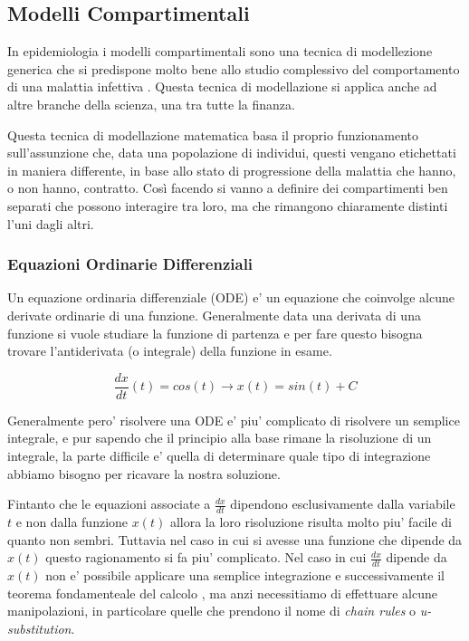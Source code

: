 \subsection{Modelli Compartimentali}
In epidemiologia i modelli compartimentali sono una tecnica di modellezione 
generica che si predispone molto bene allo studio complessivo del comportamento
di una malattia infettiva \cite{wiki:Compartmental_models_in_epidemiology}. 
Questa tecnica di modellazione si applica anche ad altre branche della 
scienza, una tra tutte la finanza.

Questa tecnica di modellazione matematica basa il proprio funzionamento 
sull'assunzione che, data una popolazione di individui, questi vengano 
etichettati in maniera differente, in base allo stato di progressione 
della malattia che hanno, o non hanno, contratto. Così facendo si vanno a 
definire dei compartimenti ben separati che possono interagire tra loro, ma 
che rimangono chiaramente distinti l'uni dagli altri.

\subsubsection*{Equazioni Ordinarie Differenziali}
Un equazione ordinaria differenziale (ODE) e' un equazione che coinvolge alcune derivate
ordinarie di una funzione. \cite{wiki:Equazione_differenziale_ordinaria} Generalmente data una 
derivata di una funzione si vuole studiare la funzione di partenza e per fare questo bisogna trovare 
l'antiderivata (o integrale) della funzione in esame. 

$$\frac{dx}{dt}(t) = cos(t) \rightarrow x(t) = sin(t) + C$$

Generalmente pero' risolvere una ODE e' piu' complicato di risolvere un semplice integrale, e pur sapendo 
che il principio alla base rimane la risoluzione di un integrale, la parte difficile e' quella di determinare
quale tipo di integrazione abbiamo bisogno per ricavare la nostra soluzione.

Fintanto che le equazioni associate a $\frac{dx}{dt}$ dipendono esclusivamente dalla variabile $t$ e non 
dalla funzione $x(t)$ allora la loro risoluzione risulta molto piu' facile di quanto non sembri. Tuttavia 
nel caso in cui si avesse una funzione che dipende da $x(t)$ questo ragionamento si fa piu' complicato.
Nel caso in cui $\frac{dx}{dt}$ dipende da $x(t)$ non e' possibile applicare una semplice integrazione e 
successivamente il teorema fondamenteale del calcolo \cite{wiki:Fundamental_theorem_of_calculus}, ma anzi 
necessitiamo di effettuare alcune manipolazioni, in particolare quelle che prendono il nome di \emph{chain rules}
o \emph{u-substitution}.

